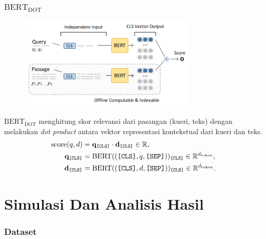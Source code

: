 \documentclass[10pt]{beamer}
\newcommand{\f}[1]{\textit{#1}}
\newcommand{\code}[1]{\texttt{#1}}
\begin{document}
\begin{frame}
    \frametitle{$\text{BERT}_{\text{DOT}}$}
    \begin{figure}[!ht]
        \centering
        \includegraphics[width=0.75\textwidth]{assets/pics/bertdot.png}
    \end{figure}
    $\text{BERT}_{\text{DOT}}$ menghitung skor relevansi dari pasangan (kueri, teks) dengan melakukan \f{dot product} antara vektor representasi kontekstual dari kueri dan teks.
    \begin{align*}
        \text{score}(q,d) &= \mathbf{q}_{\text{\code{[CLS]}}} \cdot \mathbf{d}_{\text{\code{[CLS]}}} \in \mathbb{R}, \\
        \mathbf{q}_{\text{\code{[CLS]}}} &= \text{BERT}((\text{\code{[CLS]}}, q, \text{\code{[SEP]}}))_{\text{\code{[CLS]}}} \in \mathbb{R}^{d_{\text{token}}}, \\
        \mathbf{d}_{\text{\code{[CLS]}}} &= \text{BERT}((\text{\code{[CLS]}}, d, \text{\code{[SEP]}}))_{\text{\code{[CLS]}}} \in \mathbb{R}^{d_{\text{token}}}.
    \end{align*}
\end{frame}

\section{Simulasi Dan Analisis Hasil}

\begin{frame}
    \frametitle{Dataset}
\end{frame}
\end{document}

